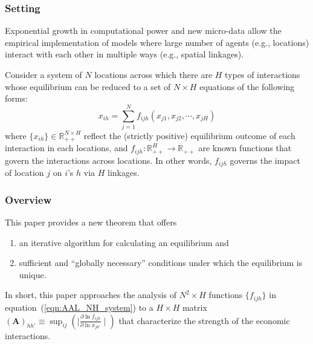 \subsubsection{Setting}
Exponential growth in computational power and new micro-data allow
the empirical implementation of models where large number of agents (e.g., locations) interact 
with each other in multiple ways (e.g., spatial linkages).

Consider a system of $N$ locations across which there are $H$ types of interactions whose equilibrium 
can be reduced to a set of $N \times H$ equations of the following forms:
\begin{equation}
    \label{eqn:AAL_NH_system}
    x_{ih} = \sum_{j = 1}^N f_{ijh}(x_{j1}, x_{j2}, \cdots, x_{jH})
\end{equation}
where $\{ x_{ih}\} \in \mathbb{R}_{++}^{N \times H}$ reflect the (strictly positive) equilibrium outcome
of each interaction in each locations,
and $f_{ijh}: \mathbb{R}_{++}^{H} \rightarrow \mathbb{R}_{++}$ are known functions that govern the interactions across locations.
In other words, $f_{ijh}$ governs the impact of location $j$ on $i$'s $h$ via $H$ linkages.

\subsubsection{Overview}
This paper provides a new theorem that offers
\begin{enumerate}
    \item an iterative algorithm for calculating an equilibrium and 
    \item sufficient and “globally necessary” conditions under which the equilibrium is unique.
\end{enumerate}
In short, this paper approaches the analysis of $N^2 \times H$ functions $\{ f_{ijh} \}$ in equation~(\ref{eqn:AAL_NH_system})
to a $H \times H$ matrix $(\mathbf{A})_{hh'} \equiv \sup_{ij} \left( \mid \frac{\partial \ln f_{ijh}}{\partial \ln x_{jh'}} \mid \right)$
that characterize the strength of the economic interactions.

